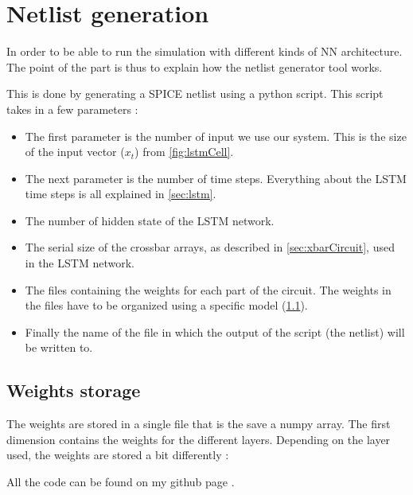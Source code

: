 \section{Netlist generation}
\label{sec:netlist}

In order to be able to run the simulation with different kinds of \ac{NN} architecture. The point of the part is thus to explain how the netlist generator tool works.

This is done by generating a SPICE netlist using a python script. This script takes in a few parameters :

\begin{itemize}
  \item The first parameter is the number of input we use our system. This is the size of the input vector ($x_t$) from \cref{fig:lstmCell}.
  \item The next parameter is the number of time steps. Everything about the \ac{LSTM} time steps is all explained in \cref{sec:lstm}.
  \item The number of hidden state of the \ac{LSTM} network.
  \item The serial size of the crossbar arrays, as described in \cref{sec:xbarCircuit}, used in the \ac{LSTM} network.
  \item The files containing the weights for each part of the circuit. The weights in the files have to be organized using a specific model (\cref{subsec:weiStore}).
  \item Finally the name of the file in which the output of the script (the netlist) will be written to.
\end{itemize}

\subsection{Weights storage}\label{subsec:weiStore}

The weights are stored in a single file that is the save a numpy array. The first dimension contains the weights for the different layers. Depending on the layer used, the weights are stored a bit differently :


All the code can be found on my github page \cite{lstmGen}.
